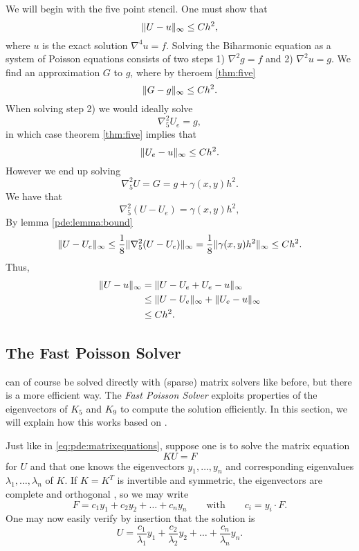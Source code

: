 We will begin with the five point stencil.
One must show that
$$
\lVert U - u \rVert_\infty \leq Ch^2,
$$
where $u$ is the exact solution $\nabla^4 u = f$.
Solving the Biharmonic equation as a system of Poisson equations consists of two steps 1) $\nabla^2 g = f$ and 2) $\nabla^2 u = g$.
We find an approximation $G$ to $g$, where by theroem \ref{thm:five}
$$
\lVert G - g \rVert_\infty \leq C h^2.
$$
When solving step 2) we would ideally solve
$$
\nabla_5^2 U_e = g,
$$
in which case theorem \ref{thm:five} implies that
$$
\lVert U_e - u \rVert_\infty \leq C h^2.
$$
However we end up solving
$$
\nabla_5^2 U = G = g + \gamma(x, y) h^2.
$$
We have that
\begin{equation}
  \nabla_5^2 (U - U_e) = \gamma(x, y) h^2,
\end{equation}
By lemma \ref{pde:lemma:bound}
$$
\lVert U - U_e \rVert_\infty \leq \frac18 \lVert \nabla_5^2 (U - U_e) \rVert_\infty = \frac18 \lVert \gamma(x, y) h^2 \rVert_\infty \leq C h^2.
$$
Thus,
\begin{align*}
  \lVert U - u \rVert_\infty &= \lVert U - U_e + U_e - u \rVert_\infty\\
  &\leq \lVert U - U_e \rVert_\infty + \lVert U_e - u \rVert_\infty\\
  &\leq C h^2.
\end{align*}


\subsection{The Fast Poisson Solver}
 can of course be solved directly with (sparse) matrix solvers like before, but there is a more efficient way.
The \emph{Fast Poisson Solver} exploits properties of the eigenvectors of $K_5$ and $K_9$ to compute the solution efficiently.
In this section, we will explain how this works based on \cite{Strang_2012}.

Just like in \cref{eq:pde:matrixequations}, suppose one is to solve the matrix equation 
$$
K U = F
$$
for $U$ and that one knows the eigenvectors $y_1, \dots, y_n$ and corresponding eigenvalues $\lambda_1, \dots, \lambda_n$ of $K$.
If $K = K^T$ is invertible and symmetric, the eigenvectors are complete and orthogonal \cite{owren}, so we may write
\begin{equation}
F = c_1 y_1 + c_2 y_2 + \dots + c_n y_n
\qquad \text{with} \qquad
c_i = y_i \cdot F.
\label{eq:pde:fexpansion}
\end{equation}
One may now easily verify by insertion that the solution is
\begin{equation}
U =
\frac{c_1}{\lambda_1} y_1
+ \frac{c_2}{\lambda_2} y_2
+ \dots
+ \frac{c_n}{\lambda_n} y_n.
\label{eq:pde:insertionsolution}
\end{equation}


